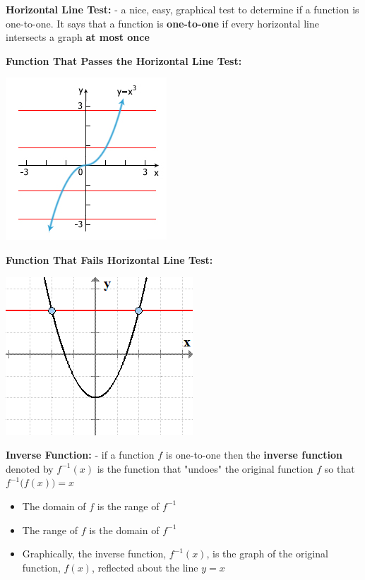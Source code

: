 \documentclass[12pt]{article}
\newenvironment{myindentpar}[1]%
     {\begin{list}{}%
             {\setlength{\leftmargin}{#1}}%
             \item[]%
     }
     {\end{list}}
\begin{document}
\begin{myindentpar}{1cm}
\textbf{Horizontal Line Test:} - a nice, easy, graphical test to determine if a function is one-to-one. It says that a function is \textbf{one-to-one} if every horizontal line intersects a graph \textbf{at most once}

\textbf{Function That Passes the Horizontal Line Test:}

\centerline{\includegraphics{PassHLT.jpg}}

\textbf{Function That Fails Horizontal Line Test:}

\centerline{\includegraphics{FailHLT.png}}

\end{myindentpar}
\newpage
\textbf{Inverse Function:} - if a function $f$ is one-to-one then the \textbf{inverse function} denoted by $f^{-1}(x)$ is the function that "undoes" the original function $f$ so that $f^{-1}\Big(f(x)\Big) = x$ 

\begin{itemize}
\item The domain of $f$ is the range of $f^{-1}$
\item The range of $f$ is the domain of $f^{-1}$
\item Graphically, the inverse function, $f^{-1}(x)$, is the graph of the original function, $f(x)$,  reflected about the line $y=x$
\end{itemize}
\end{document}
